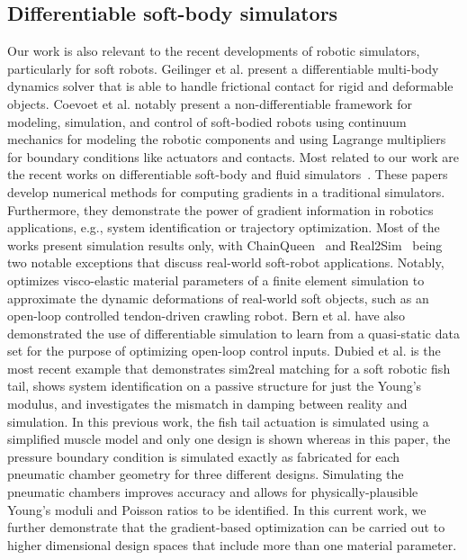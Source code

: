 \subsection{Differentiable soft-body simulators}
Our work is also relevant to the recent developments of robotic simulators, particularly for soft robots.
Geilinger et al. \cite{geilinger2020add} present a differentiable multi-body dynamics solver that is able to handle frictional contact for rigid and deformable objects.
Coevoet et al. \cite{coevoet2017software} notably present a non-differentiable framework for modeling, simulation, and control of soft-bodied robots using continuum mechanics for modeling the robotic components and using Lagrange multipliers for boundary conditions like actuators and contacts.
Most related to our work are the recent works on differentiable soft-body and fluid simulators~\cite{du2020stokes,du2021diffpd,hahn2019real2sim,hu2019difftaichi,hu2019chainqueen,huang2021plasticine,ma2021diffaqua}. 
These papers develop numerical methods for computing gradients in a traditional simulators. Furthermore, they demonstrate the power of gradient information in robotics applications, e.g., system identification or trajectory optimization. Most of the works present simulation results only, with ChainQueen~\cite{hu2019chainqueen} and Real2Sim~\cite{hahn2019real2sim} being two notable exceptions that discuss real-world soft-robot applications.
Notably, \cite{hahn2019real2sim} optimizes visco-elastic material parameters of a finite element simulation to approximate the dynamic deformations of real-world soft objects, such as an open-loop controlled tendon-driven crawling robot.
Bern et al. \cite{bern2020soft} have also demonstrated the use of differentiable simulation to learn from a quasi-static data set for the purpose of optimizing open-loop control inputs.
Dubied et al. \cite{dubied2022sim} is the most recent example that demonstrates sim2real matching for a soft robotic fish tail, shows system identification on a passive structure for just the Young's modulus, and investigates the mismatch in damping between reality and simulation. In this previous work, the fish tail actuation is simulated using a simplified muscle model and only one design is shown whereas in this paper, the pressure boundary condition is simulated exactly as fabricated for each pneumatic chamber geometry for three different designs. Simulating the pneumatic chambers improves accuracy and allows for physically-plausible Young's moduli and Poisson ratios to be identified. In this current work, we further demonstrate that the gradient-based optimization can be carried out to higher dimensional design spaces that include more than one material parameter.

